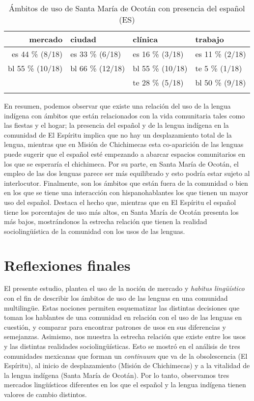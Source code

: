 \documentclass[output=paper]{../langscibook}
\begin{document}
\begin{table}
\caption{\label{tab:guerrero:17} Ámbitos de uso de Santa María de Ocotán con presencia del español (ES)}
\begin{tabularx}{\textwidth}{rYYY}
\lsptoprule
{{mercado}} & {{ciudad}} & {{clínica}} & {{trabajo}}\\
\midrule
{{es} {44} {\%} {(8/18)}} & {{es} {33} {\%} {(6/18)}} & {{es} 16 \% (3/18)} & {{es} {11} {\%} {(2/18)}}\\
{{bl} {55} {\%} {(10/18)}} & {{bl} {66} {\%} {(12/18)}} & {{bl} {55} {\%} {(10/18)}} & {{te} {5} {\%} {(1/18)}}\\
&  & {{te} {28} {\%} {(5/18)}} & {{bl} {50} {\%} {(9/18)}}\\
\lspbottomrule
\end{tabularx}
\end{table}

En resumen, podemos observar que existe una relación del uso de la lengua indígena con ámbitos que están relacionados con la vida comunitaria tales como las fiestas y el hogar; la presencia del español y de la lengua indígena en la comunidad de El Espíritu implica que no hay un desplazamiento total de la lengua, mientras que en Misión de Chichimecas esta co-aparición de las lenguas puede sugerir que el español esté empezando a abarcar espacios comunitarios en los que se esperaría el chichimeca. Por su parte, en Santa María de Ocotán, el empleo de las dos lenguas parece ser más equilibrado y esto podría estar sujeto al interlocutor. Finalmente, son los ámbitos que están fuera de la comunidad o bien en los que se tiene una interacción con hispanohablantes los que tienen un mayor uso del español. Destaca el hecho que, mientras que en El Espíritu el español tiene los porcentajes de uso más altos, en Santa María de Ocotán presenta los más bajos, mostrándonos la estrecha relación que tienen la realidad sociolingüística de la comunidad con los usos de las lenguas.
\largerpage


 \section{Reflexiones finales}
El presente estudio, plantea el uso de la noción de mercado y \textit{habitus lingüístico} con el fin de describir los ámbitos de uso de las lenguas en una comunidad multilingüe. Estas nociones permiten esquematizar las distintas decisiones que toman los hablantes de una comunidad en relación con el uso de las lenguas en cuestión, y comparar para encontrar patrones de usos en sus diferencias y semejanzas. Asimismo, nos muestra la estrecha relación que existe entre los usos y las distintas realidades sociolingüísticas. Esto se mostró en el análisis de tres comunidades mexicanas que forman un \textit{continuum} que va de la obsolescencia (El Espíritu), al inicio de desplazamiento (Misión de Chichimecas) y a la vitalidad de la lengua indígena (Santa María de Ocotán). Por lo tanto, observamos tres mercados lingüísticos diferentes en los que el español y la lengua indígena tienen valores de cambio distintos.
\end{document}
